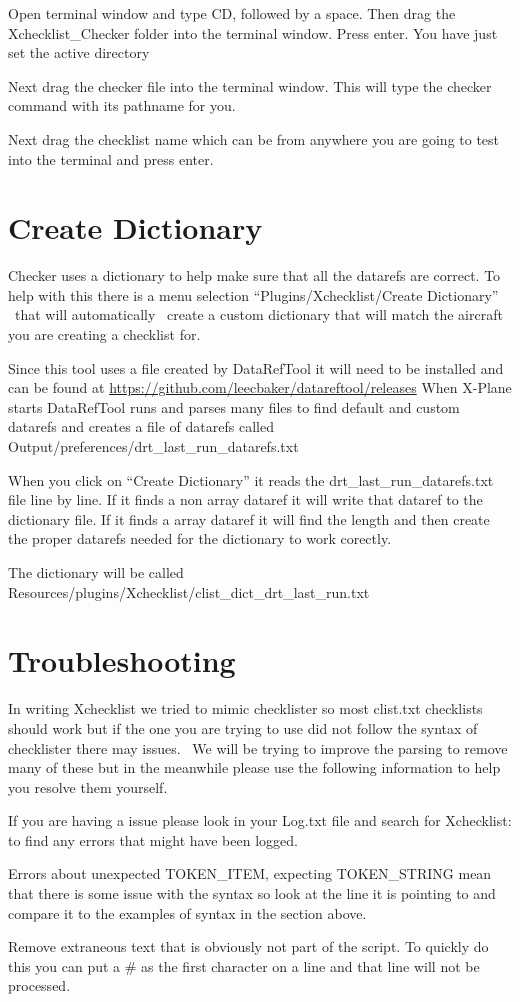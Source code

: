 \documentclass[11pt,parskip=half,a4paper]{scrartcl}
\begin{document}
Open terminal window and type CD, followed by a space. Then drag the Xchecklist\_Checker folder into the terminal window. Press enter. You have just set the active directory

Next drag the checker file into the terminal window. This will type the checker command with its pathname for you.

Next drag the checklist name which can be from anywhere you are going to test into the terminal and press enter.

\newpage
\section{Create Dictionary}


Checker uses a dictionary to help make sure that all the datarefs are correct. To help with this there is a menu
selection ``Plugins/Xchecklist/Create Dictionary'' \ that will automatically \ create a custom dictionary that will match the aircraft you are creating a checklist for.

Since this tool uses a file created by DataRefTool it will need to be installed and can be found at
\url{https://github.com/leecbaker/datareftool/releases} When X-Plane starts DataRefTool runs and parses many files to find default and custom datarefs and creates a file of datarefs called
Output/preferences/drt\_last\_run\_datarefs.txt

When you click on ``Create Dictionary'' it reads the drt\_last\_run\_datarefs.txt file line by line. If it finds a non array dataref it will write that dataref to the dictionary file. If it finds a array dataref it will find the length and then create the proper datarefs needed for the dictionary to work corectly. 

The dictionary will be called Resources/plugins/Xchecklist/clist\_dict\_drt\_last\_run.txt

\section{Troubleshooting}

In writing Xchecklist we tried to mimic checklister so most clist.txt checklists should work but if the one you are trying to use did not follow the syntax of checklister there may issues. \ We will be trying to improve the parsing to remove many of these but in the meanwhile please use the following information to help you resolve them yourself. \ 

If you are having a issue please look in your Log.txt file and search for Xchecklist: to find any errors that might have been logged.

Errors about {\textquotedbl}unexpected TOKEN\_ITEM, expecting TOKEN\_STRING{\textquotedbl} mean that there is some issue with the syntax so look at the line it is pointing to and compare it to the examples of syntax in the section above.

Remove extraneous text that is obviously not part of the script. To quickly do this you can put a \# as the first character on a line and that line will not be processed.
\end{document}
